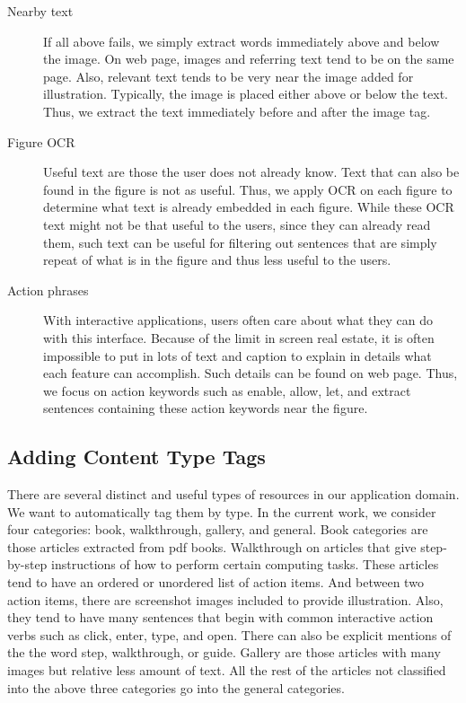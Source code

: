 \documentclass{www2010-submission}
\begin{document}
\begin{description}
\item[Nearby text] If all above fails, we simply extract
words immediately above and below the image. On web page, images
and referring text tend to be on the same page. Also, relevant
text tends to be very near the image added for illustration.
Typically, the image is placed either above or below the text.
Thus, we extract the text immediately before and after the image
tag.

\item[Figure OCR] Useful text are those the user does not already
know. Text that can also be found in the figure is not as useful.
Thus, we apply OCR on each figure to determine what text is
already embedded in each figure. While these OCR text might not be
that useful to the users, since they can already read them, such
text can be useful for filtering out sentences that are simply
repeat of what is in the figure and thus less useful to the users.

\item[Action phrases] With interactive applications, users
often care about what they can do with this interface. Because of
the limit in screen real estate, it is often impossible to put in
lots of text and caption to explain in details what each feature
can accomplish. Such details can be found on web page. Thus, we
focus on action keywords such as enable, allow, let, and extract
sentences containing these action keywords near the figure.

\end{description}

\subsection{Adding Content Type Tags}

There are several distinct and useful types of resources in our
application domain. We want to automatically tag them by type. In
the current work, we consider four categories: book, walkthrough,
gallery, and general. Book categories are those articles extracted
from pdf books. Walkthrough on articles that give step-by-step
instructions of how to perform certain computing tasks. These
articles tend to have an ordered or unordered list of action
items. And between two action items, there are screenshot images
included to provide illustration. Also, they tend to have many
sentences that begin with common interactive action verbs such as
click, enter, type, and open. There can also be explicit mentions
of the the word step, walkthrough, or guide. Gallery are those
articles with many images but relative less amount of text. All
the rest of the articles not classified into the above three
categories go into the general categories.
\end{document}

